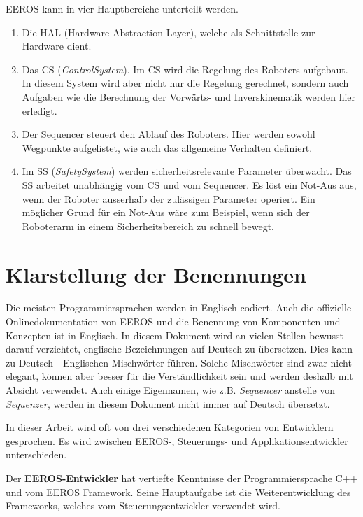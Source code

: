 EEROS kann in vier Hauptbereiche unterteilt werden.
\begin{enumerate}
\item Die HAL (Hardware Abstraction Layer), welche als Schnittstelle zur Hardware dient.
\item Das CS (\textit{ControlSystem}). Im CS wird die Regelung des Roboters aufgebaut.
In diesem System wird aber nicht nur die Regelung gerechnet, sondern auch Aufgaben wie die Berechnung der Vorwärts- und Inverskinematik werden hier erledigt.
\item Der Sequencer steuert den Ablauf des Roboters.
Hier werden sowohl Wegpunkte aufgelistet, wie auch das allgemeine Verhalten definiert. %
\item Im SS (\textit{SafetySystem}) werden sicherheitsrelevante Parameter überwacht. Das SS arbeitet unabhängig vom CS und vom Sequencer. Es löst ein Not-Aus aus, wenn der Roboter ausserhalb der zulässigen Parameter operiert. Ein möglicher Grund für ein Not-Aus wäre zum Beispiel, wenn sich der Roboterarm in einem Sicherheitsbereich zu schnell bewegt.
\end{enumerate}






\section{Klarstellung der Benennungen}
Die meisten Programmiersprachen werden in Englisch codiert.
Auch die offizielle Onlinedokumentation \cite{eerosOrg} von EEROS und die Benennung von Komponenten und Konzepten ist in Englisch.
In diesem Dokument wird an vielen Stellen bewusst darauf verzichtet, englische Bezeichnungen auf Deutsch zu übersetzen.
Dies kann zu Deutsch - Englischen Mischwörter führen.
Solche Mischwörter sind zwar nicht elegant, können aber besser für die Verständlichkeit sein und werden deshalb mit Absicht verwendet.
Auch einige Eigennamen, wie z.B. \textit{Sequencer} anstelle von \textit{Sequenzer}, werden in diesem Dokument nicht immer auf Deutsch übersetzt.

In dieser Arbeit wird oft von drei verschiedenen Kategorien von Entwicklern gesprochen.
Es wird zwischen EEROS-, Steuerungs- und Applikationsentwickler unterschieden.

Der \textbf{EEROS-Entwickler} hat vertiefte Kenntnisse der Programmiersprache C++ und vom EEROS Framework.
Seine Hauptaufgabe ist die Weiterentwicklung des Frameworks, welches vom Steuerungsentwickler verwendet wird.


